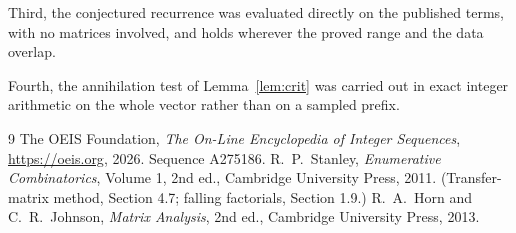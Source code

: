 \documentclass[11pt,a4paper]{article}
\theoremstyle{plain}
\theoremstyle{definition}
\begin{document}
Third, the conjectured recurrence was evaluated directly on the published terms, with no
matrices involved, and holds wherever the proved range and the data overlap.

Fourth, the annihilation test of Lemma~\ref{lem:crit} was carried out in exact integer
arithmetic on the whole vector rather than on a sampled prefix.

\begin{thebibliography}{9}
 The OEIS Foundation, \emph{The On-Line Encyclopedia of Integer
Sequences}, \url{https://oeis.org}, 2026. Sequence A275186.
 R.~P.~Stanley, \emph{Enumerative Combinatorics}, Volume 1, 2nd ed.,
Cambridge University Press, 2011. (Transfer-matrix method, Section 4.7; falling factorials,
Section 1.9.)
 R.~A.~Horn and C.~R.~Johnson, \emph{Matrix Analysis}, 2nd ed., Cambridge
University Press, 2013.
\end{thebibliography}
\end{document}
